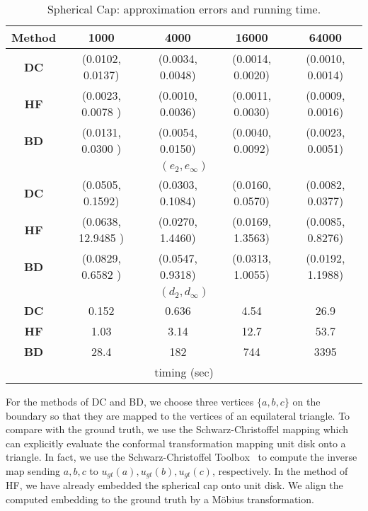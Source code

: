 \documentclass[11pt]{article}
\begin{document}
\begin{table}[!h]
\begin{center}
\begin{tabular}{| c | c | c | c | c |}
\hline
Method  & 1000 &  4000 & 16000 & 64000   \\
\hline
{\bf DC} & (0.0102, 0.0137) & (0.0034, 0.0048) & (0.0014, 0.0020) & (0.0010, 0.0014) \\
\hline
{\bf HF} & (0.0023, 0.0078 ) & (0.0010, 0.0036) & (0.0011, 0.0030) & (0.0009, 0.0016)\\
\hline
{\bf BD}& (0.0131, 0.0300 ) & (0.0054, 0.0150) & (0.0040, 0.0092) & (0.0023, 0.0051)\\
\hline
\multicolumn{5}{|c|}{ $(e_2, e_\infty)$} \\
\hline
{\bf DC} & (0.0505, 0.1592) & (0.0303, 0.1084) & (0.0160, 0.0570) & (0.0082, 0.0377) \\
\hline
{\bf HF} & (0.0638, 12.9485 ) & (0.0270, 1.4460) & (0.0169, 1.3563) & (0.0085, 0.8276)\\
\hline
{\bf BD}& (0.0829, 0.6582 ) & (0.0547, 0.9318) & (0.0313, 1.0055) & (0.0192, 1.1988)\\
\hline
\multicolumn{5}{|c|}{ $(d_2, d_\infty)$} \\
\hline
{\bf DC} & 0.152 & 0.636 & 4.54 & 26.9 \\
\hline
{\bf HF} &  1.03 & 3.14 & 12.7 & 53.7 \\
\hline
{\bf BD}& 28.4 & 182  & 744 & 3395\\
\hline
\multicolumn{5}{|c|}{ timing (sec)} \\
\hline
\end{tabular}
\end{center}
\vspace{-0.1in}
\caption{Spherical Cap: approximation errors and running time.
\label{tbl:hemisphere}
}
\end{table}


For the methods of DC and BD, we choose three vertices $\{a, b, c\}$ on the boundary so that they are mapped to 
the vertices of an equilateral triangle. To compare with the ground truth, we use the Schwarz-Christoffel mapping
which can explicitly evaluate the  conformal transformation mapping unit disk onto a triangle. 
In fact, we use the Schwarz-Christoffel Toolbox~\cite{driscoll} to compute the inverse map sending $a, b, c$ to 
$u_{gt}(a), u_{gt}(b), u_{gt}(c)$, respectively. In the method of HF, we have already embedded the spherical
cap onto unit disk. We align the computed embedding to the ground truth by a M\"{o}bius transformation. 
\end{document}
